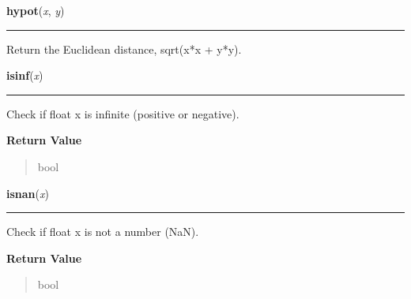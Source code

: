     \label{math:hypot}

    \vspace{0.5ex}

\hspace{.8\funcindent}\begin{boxedminipage}{\funcwidth}

    \raggedright \textbf{hypot}(\textit{x}, \textit{y})

    \vspace{-1.5ex}

    \rule{\textwidth}{0.5\fboxrule}
\setlength{\parskip}{2ex}
    Return the Euclidean distance, sqrt(x*x + y*y).

\setlength{\parskip}{1ex}
    \end{boxedminipage}

    \label{math:isinf}

    \vspace{0.5ex}

\hspace{.8\funcindent}\begin{boxedminipage}{\funcwidth}

    \raggedright \textbf{isinf}(\textit{x})

    \vspace{-1.5ex}

    \rule{\textwidth}{0.5\fboxrule}
\setlength{\parskip}{2ex}
    Check if float x is infinite (positive or negative).

\setlength{\parskip}{1ex}
      \textbf{Return Value}
    \vspace{-1ex}

      \begin{quote}
      bool

      \end{quote}

    \end{boxedminipage}

    \label{math:isnan}

    \vspace{0.5ex}

\hspace{.8\funcindent}\begin{boxedminipage}{\funcwidth}

    \raggedright \textbf{isnan}(\textit{x})

    \vspace{-1.5ex}

    \rule{\textwidth}{0.5\fboxrule}
\setlength{\parskip}{2ex}
    Check if float x is not a number (NaN).

\setlength{\parskip}{1ex}
      \textbf{Return Value}
    \vspace{-1ex}

      \begin{quote}
      bool

      \end{quote}

    \end{boxedminipage}

